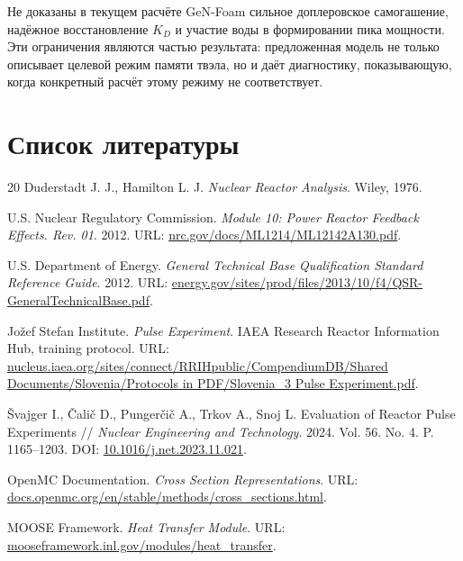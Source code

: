 \documentclass[12pt]{article}
\begin{document}
Не доказаны в текущем расчёте GeN-Foam сильное доплеровское самогашение, надёжное восстановление \(K_D\) и участие воды в формировании пика мощности. Эти ограничения являются частью результата: предложенная модель не только описывает целевой режим памяти твэла, но и даёт диагностику, показывающую, когда конкретный расчёт этому режиму не соответствует.

\newpage
\section{Список литературы}
\begin{thebibliography}{20}
    Duderstadt J. J., Hamilton L. J. \textit{Nuclear Reactor Analysis}. Wiley, 1976.

    U.S. Nuclear Regulatory Commission. \textit{Module 10: Power Reactor Feedback Effects. Rev. 01}. 2012. URL: \href{https://www.nrc.gov/docs/ML1214/ML12142A130.pdf}{nrc.gov/docs/ML1214/ML12142A130.pdf}.

    U.S. Department of Energy. \textit{General Technical Base Qualification Standard Reference Guide}. 2012. URL: \href{https://www.energy.gov/sites/prod/files/2013/10/f4/QSR-GeneralTechnicalBase.pdf}{energy.gov/sites/prod/files/2013/10/f4/QSR-GeneralTechnicalBase.pdf}.

    Jožef Stefan Institute. \textit{Pulse Experiment}. IAEA Research Reactor Information Hub, training protocol. URL: \href{https://nucleus.iaea.org/sites/connect/RRIHpublic/CompendiumDB/Shared%20Documents/Slovenia/Protocols%20in%20PDF/Slovenia_3%20Pulse%20Experiment.pdf}{nucleus.iaea.org/sites/connect/RRIHpublic/CompendiumDB/Shared Documents/Slovenia/Protocols in PDF/Slovenia\_3 Pulse Experiment.pdf}.

    Švajger I., Čalič D., Pungerčič A., Trkov A., Snoj L. Evaluation of Reactor Pulse Experiments // \textit{Nuclear Engineering and Technology}. 2024. Vol. 56. No. 4. P. 1165--1203. DOI: \href{https://doi.org/10.1016/j.net.2023.11.021}{10.1016/j.net.2023.11.021}.

    OpenMC Documentation. \textit{Cross Section Representations}. URL: \href{https://docs.openmc.org/en/stable/methods/cross_sections.html}{docs.openmc.org/en/stable/methods/cross\_sections.html}.

    MOOSE Framework. \textit{Heat Transfer Module}. URL: \href{https://mooseframework.inl.gov/modules/heat_transfer/}{mooseframework.inl.gov/modules/heat\_transfer}.


\end{thebibliography}
\end{document}
